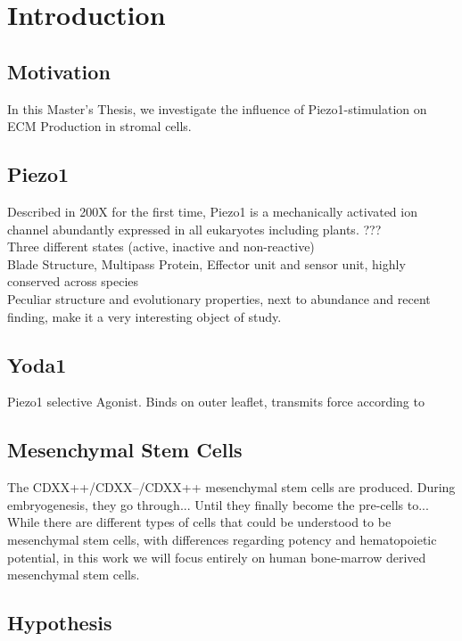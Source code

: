 \newcommand{\package}{\emph}


\chapter{Introduction}

\section{Motivation}
\label{sec:motivation}

In this Master's Thesis, we investigate the influence of Piezo1-stimulation on ECM Production in stromal cells.

\section{Piezo1}
Described in 200X for the first time, Piezo1 is a  mechanically activated ion channel abundantly expressed in all eukaryotes including plants. ???\cite{Coste55} \\
Three different states (active, inactive and non-reactive)\\
Blade Structure, Multipass Protein, Effector unit and sensor unit, highly conserved across species\\
Peculiar structure and evolutionary properties, next to abundance and recent finding, make it a very interesting object of study. 

\section{Yoda1}
Piezo1 selective Agonist. Binds on outer leaflet, transmits force according to \cite{BotelloSmith.2019} 

\section{Mesenchymal Stem Cells}
The CDXX++/CDXX--/CDXX++ mesenchymal stem cells are produced. During embryogenesis, they go through... Until they finally become the pre-cells to...
While there are different types of cells that could be understood to be mesenchymal stem cells, with differences regarding potency and hematopoietic potential, in this work we will focus entirely on human bone-marrow derived mesenchymal stem cells. 


\section{Hypothesis}

